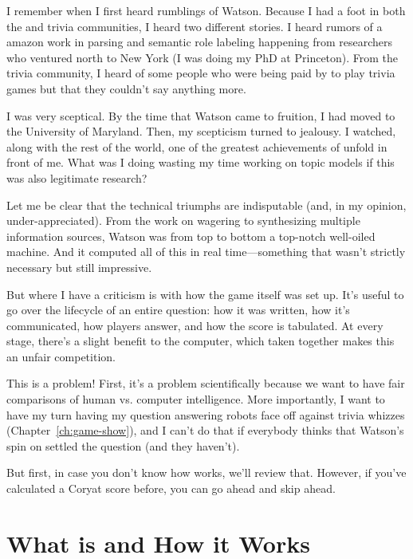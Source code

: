 

I remember when I first heard rumblings of Watson.
%
Because I had a foot in both the  and trivia communities, I
heard two different stories.
%
I heard rumors of a amazon work in parsing and semantic role labeling
happening from researchers who ventured north to New York (I was doing
my PhD at Princeton).
%
From the trivia community, I heard of some people who were being paid
by  to play trivia games but that they couldn't say anything
more.

I was very sceptical.
%
By the time that Watson came to fruition, I had moved to the
University of Maryland.
%
Then, my scepticism turned to jealousy.
%
I watched, along with the rest of the world, one of the greatest
achievements of  unfold in front of me.
%
What was I doing wasting my time working on topic models if this was
also legitimate research?

Let me be clear that the technical triumphs are indisputable (and, in
my opinion, under-appreciated).
%
From the work on wagering to synthesizing multiple information
sources, Watson was from top to bottom a top-notch well-oiled machine.
%
And it computed all of this in real time---something that wasn't
strictly necessary but still impressive.

But where I have a criticism is with how the game itself was set up.
%
It's useful to go over the lifecycle of an entire question: how it was
written, how it's communicated, how players answer, and how the score
is tabulated.
%
At every stage, there's a slight benefit to the computer, which taken
together makes this an unfair competition.

This is a problem!  First, it's a problem scientifically because we
want to have fair comparisons of human vs. computer intelligence.
%
More importantly, I want to have my turn having my question answering
robots face off against trivia whizzes (Chapter~\ref{ch:game-show}),
and I can't do that if everybody thinks that Watson's spin
on \jeopardy{} settled the question (and they haven't).


But first, in case you don't know how \jeopardy{} works, we'll review
that.
%
However, if you've calculated a Coryat score before, you can go ahead
and skip ahead.

\section{What \jeopardy{} is and How it Works}

